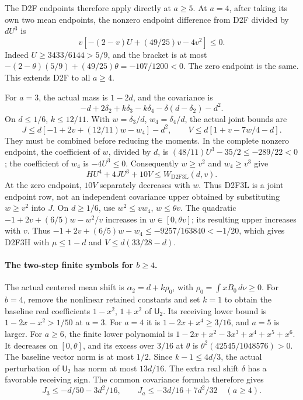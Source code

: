 The D2F endpoints therefore apply directly at \(a\ge5\).
At \(a=4\), after taking its own two mean endpoints, the nonzero
endpoint difference from D2F divided by \(dU^3\) is
\[
 v[-(2-v)U+(49/25)v-4v^2]\le0.
\]
Indeed \(U\ge3433/6144>5/9\), and the bracket is at most
\(-(2-\theta)(5/9)+(49/25)\theta=-107/1200<0\).
The zero endpoint is the same. This extends D2F to all \(a\ge4\).

For \(a=3\), the actual mass is \(1-2d\), and the covariance is
\[
 -d+2\delta_2+k\delta_3-k\delta_4
       -\delta(d-\delta_2)-d^2.
\]
On \(d\le1/6\), \(k\le12/11\). With
\(w=\delta_3/d\), \(w_4=\delta_4/d\), the actual joint bounds are
\[
 J\le d[-1+2v+(12/11)w-w_4]-d^2,\qquad
 V\le d[1+v-7w/4-d].
\]
They must be combined before reducing the moments. In the complete
nonzero endpoint, the coefficient of \(w\), divided by \(d\), is
\((48/11)U^3-35/2\le-289/22<0\); the coefficient of \(w_4\)
is \(-4U^3\le0\). Consequently \(w\ge v^2\) and
\(w_4\ge v^3\) give
\begin{equation}\label{eq:q117-unified:joint-low23}
 HU^4+4JU^3+10V\le W_{\mathrm{D2F3L}}(d,v).
\end{equation}
At the zero endpoint, \(10V\) separately decreases with \(w\).
Thus D2F3L is a joint endpoint row, not an independent covariance
upper obtained by substituting \(w\ge v^2\) into \(J\).
On \(d\ge1/6\), use \(w^2\le vw_4\), \(w\le\theta v\).
The quadratic \(-1+2v+(6/5)w-w^2/v\) increases in
\(w\in[0,\theta v]\); its resulting upper increases with \(v\).
Thus \(-1+2v+(6/5)w-w_4\le-9257/163840<-1/20\),
which gives D2F3H with \(\mu\le1-d\) and
\(V\le d(33/28-d)\).

\paragraph{The two-step finite symbols for \(b\ge4\).}
The actual centered mean shift is
\(\alpha_2=d+k\rho_0\), with
\(\rho_0=\int xB_0\,d\nu\ge0\).
For \(b=4\), remove the nonlinear retained constants and set
\(k=1\) to obtain the baseline real coefficients
\(1-x^2\), \(1+x^2\) of \(\mathsf U_2\).
Its receiving lower bound is \(1-2x-x^2>1/50\) at \(a=3\).
For \(a=4\) it is \(1-2x+x^4\ge3/16\), and \(a=5\) is larger.
For \(a\ge6\), the finite lower polynomial is
\(1-2x+x^2-3x^3+x^4+x^5+x^6\).
It decreases on \([0,\theta]\), and its excess over \(3/16\)
at \(\theta\) is \(\theta^2(42545/1048576)>0\).
The baseline vector norm is at most \(1/2\). Since
\(k-1\le4d/3\), the actual perturbation of \(\mathsf U_2\)
has norm at most \(13d/16\). The extra real shift \(\delta\)
has a favorable receiving sign. The common covariance formula
therefore gives
\[
 J_3\le-d/50-3d^2/16,\qquad
 J_a\le-3d/16+7d^2/32\quad(a\ge4).
\]

